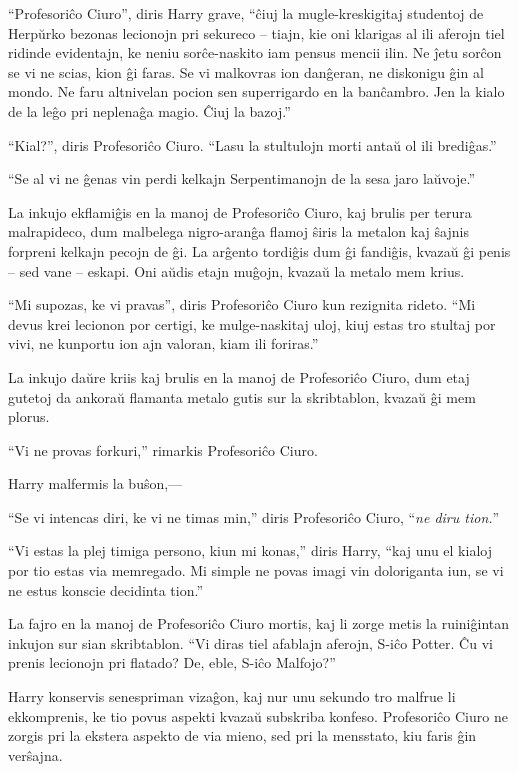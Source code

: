``Profesoriĉo Ciuro'', diris Harry grave, ``ĉiuj la mugle-kreskigitaj studentoj
de Herpŭrko bezonas lecionojn pri sekureco -- tiajn, kie oni klarigas al ili
aferojn tiel ridinde evidentajn, ke neniu sorĉe-naskito iam pensus mencii ilin.
Ne ĵetu sorĉon se vi ne scias, kion ĝi faras. Se vi malkovras ion danĝeran, ne
diskonigu ĝin al mondo. Ne faru altnivelan pocion sen superrigardo en la
banĉambro. Jen la kialo de la leĝo pri neplenaĝa magio. Ĉiuj la bazoj.''

``Kial?'', diris Profesoriĉo Ciuro. ``Lasu la stultulojn morti antaŭ ol ili
brediĝas.''

``Se al vi ne ĝenas vin perdi kelkajn Serpentimanojn de la sesa jaro laŭvoje.''

La inkujo ekflamiĝis en la manoj de Profesoriĉo Ciuro, kaj brulis per terura
malrapideco, dum malbelega nigro-aranĝa flamoj ŝiris la metalon kaj ŝajnis
forpreni kelkajn pecojn de ĝi. La arĝento tordiĝis dum ĝi fandiĝis, kvazaŭ ĝi
penis -- sed vane -- eskapi. Oni aŭdis etajn muĝojn, kvazaŭ la metalo mem krius.

``Mi supozas, ke vi pravas'', diris Profesoriĉo Ciuro kun rezignita rideto. ``Mi
devus krei lecionon por certigi, ke mulge-naskitaj uloj, kiuj estas tro stultaj
por vivi, ne kunportu ion ajn valoran, kiam ili foriras.''

La inkujo daŭre kriis kaj brulis en la manoj de Profesoriĉo Ciuro, dum etaj
gutetoj da ankoraŭ flamanta metalo gutis sur la skribtablon, kvazaŭ ĝi mem
plorus.

``Vi ne provas forkuri,'' rimarkis Profesoriĉo Ciuro.

Harry malfermis la buŝon,—

``Se vi intencas diri, ke vi ne timas min,'' diris Profesoriĉo Ciuro, ``\emph{ne
diru tion.}''

``Vi estas la plej timiga persono, kiun mi konas,'' diris Harry, ``kaj unu el
kialoj por tio estas via memregado. Mi simple ne povas imagi vin doloriganta
iun, se vi ne estus konscie decidinta tion.''

La fajro en la manoj de Profesoriĉo Ciuro mortis, kaj li zorge metis la
ruiniĝintan inkujon sur sian skribtablon. ``Vi diras tiel afablajn aferojn,
S-iĉo Potter. Ĉu vi prenis lecionojn pri flatado? De, eble, S-iĉo Malfojo?''

Harry konservis senespriman vizaĝon, kaj nur unu sekundo tro malfrue li
ekkomprenis, ke tio povus aspekti kvazaŭ subskriba konfeso. Profesoriĉo Ciuro ne
zorgis pri la ekstera aspekto de via mieno, sed pri la mensstato, kiu faris ĝin
verŝajna.

